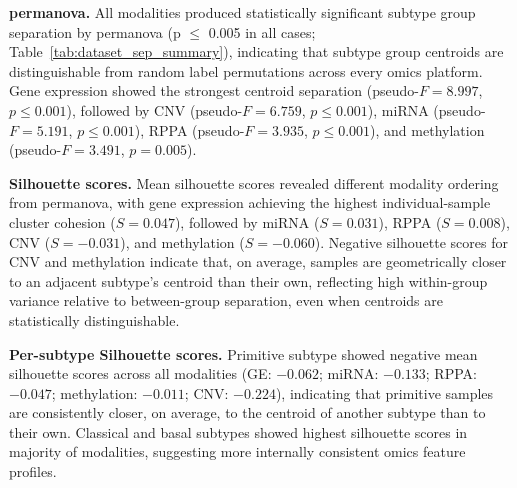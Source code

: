 \textbf{\gls{permanova}.} All modalities produced statistically significant subtype group separation by \gls{permanova} (p $\leq$ 0.005 in all cases; Table~\ref{tab:dataset_sep_summary}), indicating that subtype group centroids are distinguishable from random label permutations across every omics platform. Gene expression showed the strongest centroid separation (pseudo-$F = 8.997$, $p \leq 0.001$), followed by CNV (pseudo-$F = 6.759$, $p \leq 0.001$), miRNA (pseudo-$F = 5.191$, $p \leq 0.001$), RPPA (pseudo-$F = 3.935$, $p \leq 0.001$), and methylation (pseudo-$F = 3.491$, $p = 0.005$).



\textbf{Silhouette scores.} Mean silhouette scores revealed different modality ordering from \gls{permanova}, with gene expression achieving the highest individual-sample cluster cohesion ($S = 0.047$), followed by miRNA ($S = 0.031$), RPPA ($S = 0.008$), CNV ($S = -0.031$), and methylation ($S = -0.060$). Negative silhouette scores for CNV and methylation indicate that, on average, samples are geometrically closer to an adjacent subtype's centroid than their own, reflecting high within-group variance relative to between-group separation, even when centroids are statistically distinguishable. 

\textbf{Per-subtype Silhouette scores.} Primitive subtype showed negative mean silhouette scores across all modalities (GE: $-0.062$; miRNA: $-0.133$; RPPA: $-0.047$; methylation: $-0.011$; CNV: $-0.224$), indicating that primitive samples are consistently closer, on average, to the centroid of another subtype than to their own. Classical and basal subtypes showed highest silhouette scores in majority of modalities, suggesting more internally consistent omics feature profiles.

